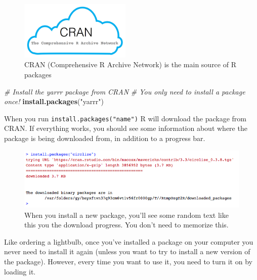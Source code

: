 \documentclass[]{book}
\newenvironment{Shaded}{\begin{snugshade}}{\end{snugshade}}
\newcommand{\KeywordTok}[1]{\textcolor[rgb]{0.13,0.29,0.53}{\textbf{{#1}}}}
\newcommand{\StringTok}[1]{\textcolor[rgb]{0.31,0.60,0.02}{{#1}}}
\newcommand{\CommentTok}[1]{\textcolor[rgb]{0.56,0.35,0.01}{\textit{{#1}}}}
\newcommand{\NormalTok}[1]{{#1}}
\theoremstyle{definition}
\theoremstyle{definition}
\theoremstyle{remark}
\begin{document}
\begin{figure}

{\centering \includegraphics[width=200px]{images/cran} 

}

\caption{CRAN (Comprehensive R Archive Network) is the main source of R packages}\label{fig:cran}
\end{figure}

\begin{Shaded}
\begin{Highlighting}[]
\CommentTok{# Install the yarrr package from CRAN}
\CommentTok{#   You only need to install a package once!}
\KeywordTok{install.packages}\NormalTok{(}\StringTok{"yarrr"}\NormalTok{)}
\end{Highlighting}
\end{Shaded}

When you run \texttt{install.packages("name")} R will download the
package from CRAN. If everything works, you should see some information
about where the package is being downloaded from, in addition to a
progress bar.

\begin{figure}

{\centering \includegraphics[width=500px]{images/installingpackages} 

}

\caption{When you install a new package, you'll see some random text like this you the download progress. You don't need to memorize this.}\label{fig:installingpackages}
\end{figure}

Like ordering a lightbulb, once you've installed a package on your
computer you never need to install it again (unless you want to try to
install a new version of the package). However, every time you want to
use it, you need to turn it on by loading it.
\end{document}
